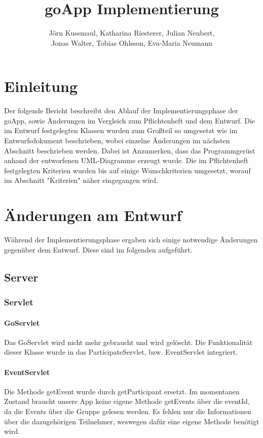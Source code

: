 \documentclass{scrartcl}
\title{goApp Implementierung}
\author{Jörn Kussmaul, Katharina Riesterer, Julian Neubert,\\ Jonas Walter, Tobias Ohlsson, Eva-Maria Neumann}
\begin{document}
	\maketitle
	\newpage
	\tableofcontents
	\newpage

	\section{Einleitung}
	
	Der folgende Bericht beschreibt den Ablauf der Implementierungsphase der goApp, sowie Änderungen im Vergleich zum Pflichtenheft und dem Entwurf. Die im Entwurf festgelegten Klassen wurden zum Großteil so umgesetzt wie im Entwurfsdokument beschrieben, wobei einzelne Änderungen im nächsten Abschnitt beschrieben werden. Dabei ist Anzumerken, dass das Programmgerüst anhand der entworfenen UML-Diagramme erzeugt wurde. Die im Pflichtenheft festgelegten Kriterien wurden bis auf einige Wunschkriterien umgesetzt, worauf im Abschnitt "Kriterien" näher eingegangen wird.
	\newpage
	\section{Änderungen am Entwurf}
	Während der Implementierungsphase ergaben sich einige notwendige Änderungen gegenüber dem Entwurf. Diese sind im folgenden aufgeführt.
	
	\subsection{Server}
	\subsubsection{Servlet}
	\paragraph{GoServlet}
	Das GoServlet wird nicht mehr gebraucht und wird gelöscht. Die Funktionalität dieser Klasse wurde in das ParticipateServlet, bzw. EventServlet integriert.
	
	\paragraph{EventServlet}
	Die Methode getEvent wurde durch getParticipant ersetzt. Im momentanen Zustand braucht unsere App keine eigene Methode getEvents über die eventId, da die Events über die Gruppe gelesen werden. 
	Es fehlen nur die Informationen über die dazugehörigen Teilnehmer, weswegen dafür eine eigene Methode benötigt wird.
	
\end{document}
